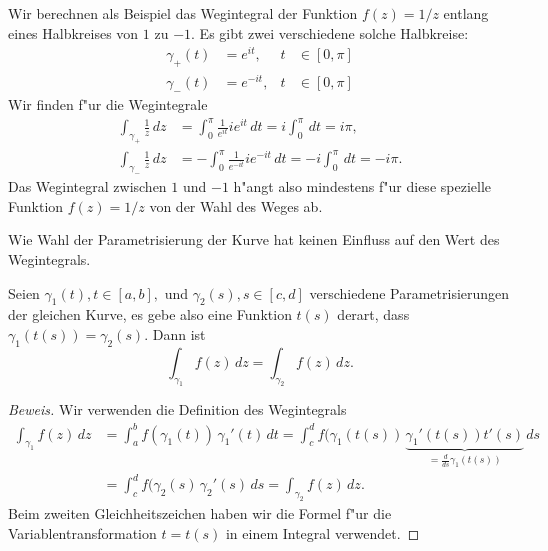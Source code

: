 \begin{beispiel}
Wir berechnen als Beispiel das Wegintegral der Funktion $f(z)=1/z$ entlang
eines Halbkreises von $1$ zu $-1$. 
Es gibt zwei verschiedene solche Halbkreise:
\begin{equation*}
\begin{aligned}
\gamma_+(t)&=e^{it},&t&\in[0,\pi]
\\
\gamma_-(t)&=e^{-it},&t&\in[0,\pi]
\end{aligned}
\end{equation*}
Wir finden f"ur die Wegintegrale
\begin{align*}
\int_{\gamma_+}\frac1z\,dz
&=
\int_0^\pi \frac1{e^{it}}ie^{it}\,dt=i\int_0^\pi\,dt=i\pi,
\\
\int_{\gamma_-}\frac1z\,dz
&=
-\int_0^\pi \frac1{e^{-it}}ie^{-it}\,dt=-i\int_0^\pi\,dt=-i\pi.
\end{align*}
Das Wegintegral zwischen $1$ und $-1$ h"angt also mindestens f"ur diese
spezielle Funktion $f(z)=1/z$ von der Wahl des Weges ab.
\end{beispiel}

Wie Wahl der Parametrisierung der Kurve hat keinen Einfluss auf den 
Wert des Wegintegrals.

\begin{satz}
Seien $\gamma_1(t), t\in[a,b],$ und $\gamma_2(s),s\in[c,d]$
verschiedene Parametrisierungen
%
der gleichen Kurve, es gebe also eine Funktion $t(s)$ derart, dass
$\gamma_1(t(s))=\gamma_2(s)$.
Dann ist
\[
\int_{\gamma_1}f(z)\,dz
=
\int_{\gamma_2}f(z)\,dz.
\]
\end{satz}

\begin{proof}[Beweis]
Wir verwenden die Definition des Wegintegrals
\begin{align*}
\int_{\gamma_1} f(z)\,dz
&=
\int_a^b f(\gamma_1(t))\,\gamma_1'(t)\,dt
=
\int_c^d f(\gamma_1(t(s))\,\underbrace{\gamma_1'(t(s)) t'(s)}_{\displaystyle
=\frac{d}{ds}\gamma_1(t(s))}\,ds
\\
&=
\int_c^d f(\gamma_2(s)\,\gamma_2'(s)\,ds
=
\int_{\gamma_2}f(z)\,dz.
\end{align*}
Beim zweiten Gleichheitszeichen haben wir die Formel f"ur die
Variablentransformation $t=t(s)$ in einem Integral verwendet.
%
\end{proof}

